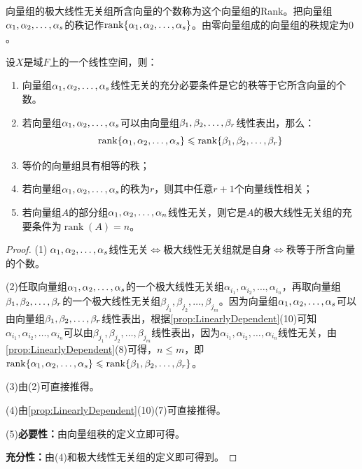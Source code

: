 \begin{definition}
	向量组的极大线性无关组所含向量的个数称为这个向量组的\gls{Rank}。把向量组$\alpha_1, \alpha_2, \dots, \alpha_{s}$的秩记作$\operatorname{rank}\{\alpha_1, \alpha_2, \dots, \alpha_{s}\}$。由零向量组成的向量组的秩规定为$0$。
\end{definition}
\begin{property}\label{prop:Rank}
	设$X$是域$F$上的一个线性空间，则：
	\begin{enumerate}
		\item 向量组$\alpha_1, \alpha_2, \dots, \alpha_{s}$线性无关的充分必要条件是它的秩等于它所含向量的个数。
		\item 若向量组$\alpha_1, \alpha_2, \dots, \alpha_{s}$可以由向量组$\beta_1, \beta_2, \dots, \beta_{r}$线性表出，那么：
		\begin{equation*}
			\operatorname{rank}\{\alpha_1, \alpha_2, \dots, \alpha_{s}\}\leqslant\operatorname{rank}\{\beta_1, \beta_2, \dots, \beta_{r}\}
		\end{equation*}
		\item 等价的向量组具有相等的秩；
		\item 若向量组$\alpha_1, \alpha_2, \dots, \alpha_{s}$的秩为$r$，则其中任意$r+1$个向量线性相关；
		\item 若向量组$A$的部分组$\alpha_1, \alpha_2, \dots, \alpha_{n}$线性无关，则它是$A$的极大线性无关组的充要条件为$\operatorname{rank}(A)=n$。
	\end{enumerate}
\end{property}
\begin{proof}
	(1)$\;\alpha_1, \alpha_2, \dots, \alpha_{s}$线性无关$\iff$极大线性无关组就是自身$\iff$秩等于所含向量的个数。\par
	(2)任取向量组$\alpha_1, \alpha_2, \dots, \alpha_{s}$的一个极大线性无关组$\alpha_{i_1},\alpha_{i_2},\dots,\alpha_{i_n}$，再取向量组$\beta_1, \beta_2, \dots, \beta_{r}$的一个极大线性无关组$\beta_{j_1},\beta_{j_2},\dots,\beta_{j_m}$。因为向量组$\alpha_1, \alpha_2, \dots, \alpha_{s}$可以由向量组$\beta_1, \beta_2, \dots, \beta_{r}$线性表出，根据\cref{prop:LinearlyDependent}(10)可知$\alpha_{i_1},\alpha_{i_2},\dots,\alpha_{i_n}$可以由$\beta_{j_1},\beta_{j_2},\dots,\beta_{j_m}$线性表出，因为$\alpha_{i_1},\alpha_{i_2},\dots,\alpha_{i_n}$线性无关，由\cref{prop:LinearlyDependent}(8)可得，$n\leqslant m$，即$\operatorname{rank}\{\alpha_1, \alpha_2, \dots, \alpha_{s}\}\leqslant\operatorname{rank}\{\beta_1, \beta_2, \dots, \beta_{r}\}$。\par
	(3)由(2)可直接推得。\par
	(4)由\cref{prop:LinearlyDependent}(10)(7)可直接推得。\par
	(5)\textbf{必要性：}由向量组秩的定义立即可得。\par
	\textbf{充分性：}由(4)和极大线性无关组的定义即可得到。
\end{proof}
